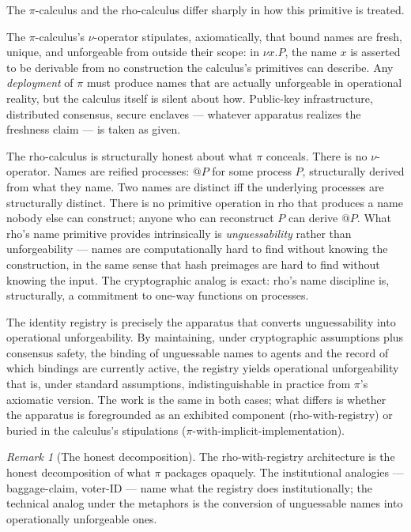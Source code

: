 \documentclass[11pt]{article}
\theoremstyle{definition}
\theoremstyle{plain}
\theoremstyle{remark}
\newtheorem*{remark}{Remark}
\begin{document}
The $\pi$-calculus and the rho-calculus differ sharply in how this primitive is treated.

The $\pi$-calculus's $\nu$-operator stipulates, axiomatically, that bound names are fresh, unique, and unforgeable from outside their scope: in $\nu x.P$, the name $x$ is asserted to be derivable from no construction the calculus's primitives can describe. Any \emph{deployment} of $\pi$ must produce names that are actually unforgeable in operational reality, but the calculus itself is silent about how. Public-key infrastructure, distributed consensus, secure enclaves --- whatever apparatus realizes the freshness claim --- is taken as given.

The rho-calculus is structurally honest about what $\pi$ conceals. There is no $\nu$-operator. Names are reified processes: $@P$ for some process $P$, structurally derived from what they name. Two names are distinct iff the underlying processes are structurally distinct. There is no primitive operation in rho that produces a name nobody else can construct; anyone who can reconstruct $P$ can derive $@P$. What rho's name primitive provides intrinsically is \emph{unguessability} rather than unforgeability --- names are computationally hard to find without knowing the construction, in the same sense that hash preimages are hard to find without knowing the input. The cryptographic analog is exact: rho's name discipline is, structurally, a commitment to one-way functions on processes.

The identity registry is precisely the apparatus that converts unguessability into operational unforgeability. By maintaining, under cryptographic assumptions plus consensus safety, the binding of unguessable names to agents and the record of which bindings are currently active, the registry yields operational unforgeability that is, under standard assumptions, indistinguishable in practice from $\pi$'s axiomatic version. The work is the same in both cases; what differs is whether the apparatus is foregrounded as an exhibited component (rho-with-registry) or buried in the calculus's stipulations ($\pi$-with-implicit-implementation).

\begin{remark}[The honest decomposition]
The rho-with-registry architecture is the honest decomposition of what $\pi$ packages opaquely. The institutional analogies --- baggage-claim, voter-ID --- name what the registry does institutionally; the technical analog under the metaphors is the conversion of unguessable names into operationally unforgeable ones.
\end{remark}
\end{document}

